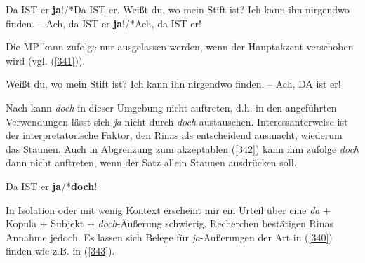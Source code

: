 \begin{exe}
	\ex\label{340} 
		\begin{xlist}	
			\ex\label{340a} Da IST er \textbf{ja}!/*Da IST er.
			\ex\label{340b} Weißt du, wo mein Stift ist? Ich kann ihn nirgendwo finden. – Ach, da IST er \textbf{ja}!/*Ach, da IST er!	         
			\hfill\hbox {\citet[167]{Rinas2006}}
		\end{xlist}
\end{exe}
Die MP kann \citet[168]{Rinas2006} zufolge nur ausgelassen werden, wenn der Haupt\-akzent verschoben wird (vgl. (\ref{341})). 

\begin{exe}
	\ex\label{341} 
	Weißt du, wo mein Stift ist? Ich kann ihn nirgendwo finden. – Ach, DA ist er!
	\hfill\hbox{\citet[168]{Rinas2006}}	
\end{exe}
Nach \citet[217]{Rinas2006} kann \textit{doch} in dieser Umgebung nicht auftreten, d.h. in den angeführten Verwendungen lässt sich \textit{ja} nicht durch \textit{doch} austauschen. Interessanterweise ist der interpretatorische Faktor, den Rinas als entscheidend ausmacht, wiederum das Staunen. Auch in Abgrenzung zum akzeptablen (\ref{342}) kann ihm zufolge \textit{doch} dann nicht auftreten, wenn der Satz allein Staunen ausdrücken soll. 

\begin{exe}
	\ex\label{342} 	
	Da IST er \textbf{ja}/*\textbf{doch}!	
	\hfill\hbox {\citet[217]{Rinas2006}}
\end{exe}											     
In Isolation oder mit wenig Kontext erscheint mir ein Urteil über eine \textit{da} $\plus$ Kopula $\plus$ Subjekt $\plus$ \textit{doch}-Äußerung schwierig, Recherchen bestätigen Rinas Annahme jedoch. Es lassen sich Belege für \textit{ja}-Äußerungen der Art in (\ref{340}) finden wie z.B. in (\ref{343}).

